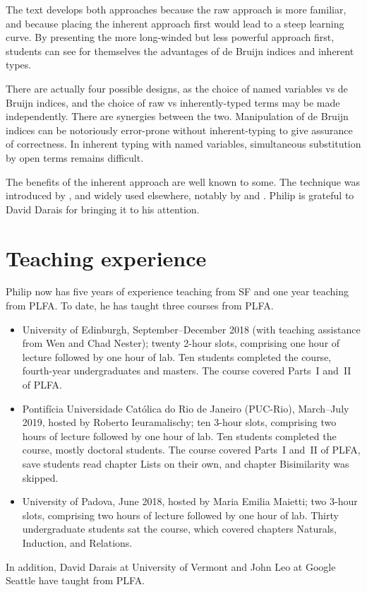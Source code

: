 \documentclass[preprint,authoryear]{elsarticle}
\begin{document}
The text develops both approaches because the raw approach is more
familiar, and because placing the inherent approach first would
lead to a steep learning curve.  By presenting the more long-winded
but less powerful approach first, students can see for themselves the
advantages of de Bruijn indices and inherent types.

There are actually four possible designs, as the choice of named
variables vs de Bruijn indices, and the choice of raw vs
inherently-typed terms may be made independently.  There are synergies
between the two.  Manipulation of de Bruijn indices can be notoriously
error-prone without inherent-typing to give assurance of correctness.
In inherent typing with named variables, simultaneous substitution by
open terms remains difficult.

The benefits of the inherent approach
are well known to some. The technique was introduced by
\citet{Altenkirch-and-Reus-1999}, and widely used elsewhere,
notably by \citet{Chapman-2009} and \citet{Allais-et-al-2017}.
Philip is grateful to David Darais for bringing it to his attention.


\section{Teaching experience}

Philip now has five years of experience teaching from SF and one year
teaching from PLFA.  To date, he has taught three courses from PLFA.
\begin{itemize}
\item
  University of Edinburgh, September--December 2018 (with teaching
  assistance from Wen and Chad Nester); twenty 2-hour slots,
  comprising one hour of lecture followed by one hour of lab. Ten
  students completed the course, fourth-year undergraduates and
  masters.  The course covered Parts~I and~II of PLFA.

\item
  Pontifícia Universidade Católica do Rio de Janeiro (PUC-Rio),
  March--July 2019, hosted by Roberto Ieuramalischy; ten 3-hour
  slots, comprising two hours of lecture followed by one hour of lab.
  Ten students completed the course, mostly doctoral students.  The
  course covered Parts~I and~II of PLFA, save students read chapter
  Lists on their own, and chapter Bisimilarity was skipped.

\item
  University of Padova, June 2018, hosted by Maria Emilia Maietti; two
  3-hour slots, comprising two hours of lecture followed by one
  hour of lab.  Thirty undergraduate students sat the course, which
  covered chapters Naturals, Induction, and Relations.

\end{itemize}
In addition, David Darais at University of Vermont and John Leo at
Google Seattle have taught from PLFA.
\end{document}
